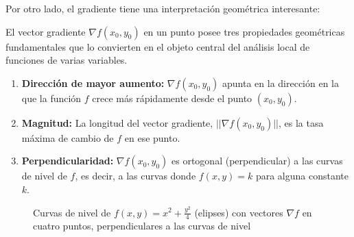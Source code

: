 Por otro lado, el gradiente tiene una interpretación geométrica interesante:



El vector gradiente $\nabla f(x_0,y_0)$ en un punto posee tres
propiedades geométricas fundamentales que lo convierten en el objeto
central del análisis local de funciones de varias variables.

\begin{enumerate}
    \item \textbf{Dirección de mayor aumento:} $\nabla f(x_0,y_0)$
    apunta en la dirección en la que la función $f$ crece más
    rápidamente desde el punto $(x_0,y_0)$.
    \item \textbf{Magnitud:} La longitud del vector gradiente,
    $||\nabla f(x_0,y_0)||$, es la tasa máxima de cambio de $f$ en ese
    punto.
    \item \textbf{Perpendicularidad:} $\nabla f(x_0,y_0)$ es ortogonal
    (perpendicular) a las curvas de nivel de $f$, es decir, a las curvas
    donde $f(x,y) = k$ para alguna constante $k$.
\end{enumerate}

\begin{figure}[!htbp]
\centering
{}
\caption{Curvas de nivel de $f(x,y)=x^2+\tfrac{y^2}{4}$ (elipses)
         con vectores $\nabla f$ en cuatro puntos, perpendiculares
         a las curvas de nivel}
\label{fig:gradiente_curvas_nivel}
\end{figure}


